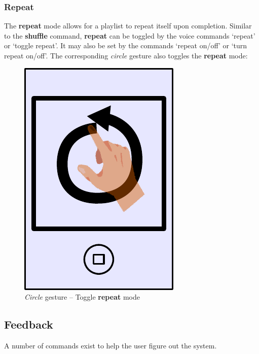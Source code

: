 \documentclass[12pt,letterpaper]{article}
\begin{document}
\subsubsection*{Repeat}
The \textbf{repeat} mode allows for a playlist to repeat itself upon completion. Similar to the \textbf{shuffle} command, \textbf{repeat} can be toggled by the voice commands `repeat' or `toggle repeat'. It may also be set by the commands `repeat on/off' or `turn repeat on/off'. The corresponding \emph{circle} gesture also toggles the \textbf{repeat} mode:
\begin{figure}[H]
	\centering
	\includegraphics[scale=0.6]{circle}
	\caption{\emph{Circle} gesture -- Toggle \textbf{repeat} mode}
\end{figure}

\subsection*{Feedback}
A number of commands exist to help the user figure out the system.
\end{document}
